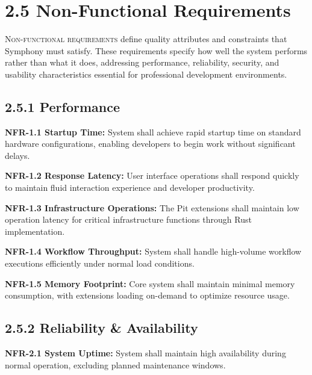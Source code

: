 
\section{2.5 Non-Functional Requirements}
\label{sec:non-functional-requirements}

\lettrine{N}{on-functional requirements} define quality attributes and constraints that Symphony must satisfy. These requirements specify how well the system performs rather than what it does, addressing performance, reliability, security, and usability characteristics essential for professional development environments.

\subsection*{2.5.1 Performance}

\textbf{NFR-1.1 Startup Time:}
System shall achieve rapid startup time on standard hardware configurations, enabling developers to begin work without significant delays.

\textbf{NFR-1.2 Response Latency:}
User interface operations shall respond quickly to maintain fluid interaction experience and developer productivity.

\textbf{NFR-1.3 Infrastructure Operations:}
The Pit extensions shall maintain low operation latency for critical infrastructure functions through Rust implementation.

\textbf{NFR-1.4 Workflow Throughput:}
System shall handle high-volume workflow executions efficiently under normal load conditions.

\textbf{NFR-1.5 Memory Footprint:}
Core system shall maintain minimal memory consumption, with extensions loading on-demand to optimize resource usage.

\subsection*{2.5.2 Reliability \& Availability}

\textbf{NFR-2.1 System Uptime:}
System shall maintain high availability during normal operation, excluding planned maintenance windows.


